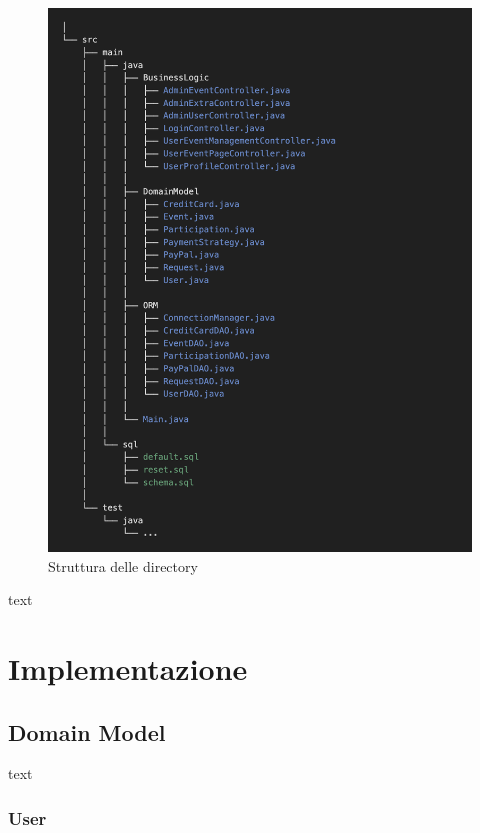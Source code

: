 \documentclass[11pt]{article}
\begin{document}
            \begin{figure}[H]
                \centering
                \includegraphics[width=\textwidth]{directory_structure_tmp}
                \caption{Struttura delle directory}
                \label{fig:directory-structure}
            \end{figure}

            text

    \section{Implementazione} \label{sec:implementazione}

        \subsection{Domain Model} \label{subsec:domain-model}

            text

            \subsubsection{User} \label{subsubsec:user}
\end{document}
